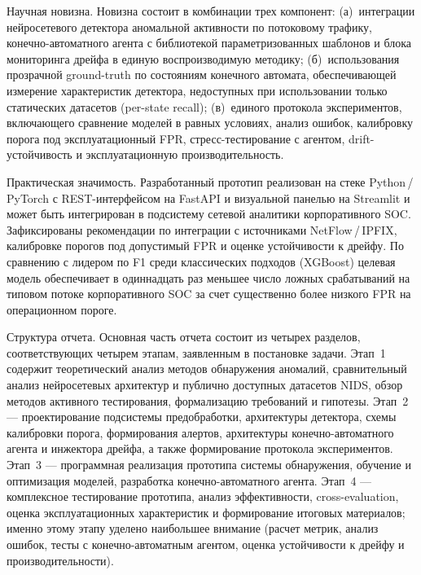 Научная новизна. Новизна состоит в комбинации трех компонент:
(а)~интеграции нейросетевого детектора аномальной активности по
потоковому трафику, конечно-автоматного агента с библиотекой
параметризованных шаблонов и блока мониторинга дрейфа в единую
воспроизводимую методику; (б)~использования прозрачной
ground-truth по состояниям конечного автомата, обеспечивающей
измерение характеристик детектора, недоступных при использовании
только статических датасетов (per-state recall); (в)~единого
протокола экспериментов, включающего сравнение моделей в равных
условиях, анализ ошибок, калибровку порога под эксплуатационный
FPR, стресс-тестирование с агентом, drift-устойчивость и
эксплуатационную производительность.

Практическая значимость. Разработанный прототип реализован на
стеке Python\,/\,PyTorch с REST-интерфейсом на FastAPI и
визуальной панелью на Streamlit и может быть интегрирован в
подсистему сетевой аналитики корпоративного SOC. Зафиксированы
рекомендации по интеграции с источниками NetFlow\,/\,IPFIX,
калибровке порогов под допустимый FPR и оценке устойчивости к
дрейфу. По сравнению с лидером по F1 среди классических подходов
(XGBoost) целевая модель обеспечивает в одиннадцать раз меньшее
число ложных срабатываний на типовом потоке корпоративного SOC за
счет существенно более низкого FPR на операционном пороге.

Структура отчета. Основная часть отчета состоит из четырех
разделов, соответствующих четырем этапам, заявленным в постановке
задачи. Этап~1 содержит теоретический анализ методов обнаружения
аномалий, сравнительный анализ нейросетевых архитектур и публично
доступных датасетов NIDS, обзор методов активного тестирования,
формализацию требований и гипотезы. Этап~2 --- проектирование
подсистемы предобработки, архитектуры детектора, схемы калибровки
порога, формирования алертов, архитектуры конечно-автоматного
агента и инжектора дрейфа, а также формирование протокола
экспериментов. Этап~3 --- программная реализация прототипа
системы обнаружения, обучение и оптимизация моделей, разработка
конечно-автоматного агента. Этап~4 --- комплексное тестирование
прототипа, анализ эффективности, cross-evaluation, оценка
эксплуатационных характеристик и формирование итоговых материалов;
именно этому этапу уделено наибольшее внимание (расчет метрик,
анализ ошибок, тесты с конечно-автоматным агентом, оценка
устойчивости к дрейфу и производительности).

